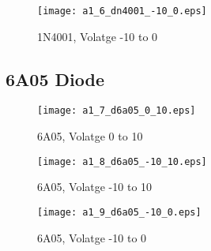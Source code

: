 	\begin{figure}[hb!]
		\centering
		\texttt{[image: a1\_6\_dn4001\_-10\_0.eps]}
		\caption{1N4001, Volatge -10 to 0}
		\label{fig:1n3}
	\end{figure}
	\begin{framed}
	
	\end{framed}


\subsection{6A05 Diode}

	\begin{figure}[hb!]
		\centering
		\texttt{[image: a1\_7\_d6a05\_0\_10.eps]}
		\caption{6A05, Volatge 0 to 10}
		\label{fig:6a1}
	\end{figure}
	\begin{framed}
	
	\end{framed}

	\begin{figure}[hb!]
		\centering
		\texttt{[image: a1\_8\_d6a05\_-10\_10.eps]}
		\caption{6A05, Volatge -10 to 10}
		\label{fig:6a2}
	\end{figure}
	\begin{framed}
	
	\end{framed}

	\begin{figure}[hb!]
		\centering
		\texttt{[image: a1\_9\_d6a05\_-10\_0.eps]}
		\caption{6A05, Volatge -10 to 0}
		\label{fig:6a3}
	\end{figure}
	\begin{framed}
	
	\end{framed}


